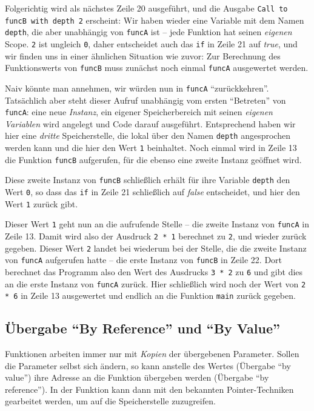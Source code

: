 Folgerichtig wird als nächstes Zeile 20 ausgeführt, und die Ausgabe \texttt{Call to funcB with depth 2} erscheint: Wir haben wieder eine Variable mit dem Namen \texttt{depth}, die aber unabhängig von \texttt{funcA} ist -- jede Funktion hat seinen \emph{eigenen} Scope. \texttt{2} ist ungleich \texttt{0}, daher entscheidet auch das \texttt{if} in Zeile 21 auf \emph{true}, und wir finden uns in einer ähnlichen Situation wie zuvor: Zur Berechnung des Funktionswerts von \texttt{funcB} muss zunächst noch einmal \texttt{funcA} ausgewertet werden.

Naiv könnte man annehmen, wir würden nun in \texttt{funcA} \enquote{zurückkehren}. Tatsächlich aber steht dieser Aufruf unabhängig vom ersten \enquote{Betreten} von \texttt{funcA}: eine neue \emph{Instanz}, \ie ein eigener Speicherbereich mit seinen \emph{eigenen Variablen} wird angelegt und Code darauf ausgeführt. Entsprechend haben wir hier eine \emph{dritte} Speicherstelle, die lokal über den Namen \texttt{depth} angesprochen werden kann und die hier den Wert \texttt{1} beinhaltet. Noch einmal wird in Zeile 13 die Funktion \texttt{funcB} aufgerufen, für die ebenso eine zweite Instanz geöffnet wird.

Diese zweite Instanz von \texttt{funcB} schließlich erhält für ihre Variable \texttt{depth} den Wert \texttt{0}, so dass das \texttt{if} in Zeile 21 schließlich auf \emph{false} entscheidet, und hier den Wert \texttt{1} zurück gibt.

Dieser Wert \texttt{1} geht nun an die aufrufende Stelle -- \ie die zweite Instanz von \texttt{funcA} in Zeile 13. Damit wird also der Ausdruck \texttt{2 * 1} berechnet zu \texttt{2}, und wieder zurück gegeben. Dieser Wert \texttt{2} landet bei wiederum bei der Stelle, die die zweite Instanz von \texttt{funcA} aufgerufen hatte -- die erste Instanz von \texttt{funcB} in Zeile 22. Dort berechnet das Programm also den Wert des Ausdrucks \texttt{3 * 2} zu \texttt{6} und gibt dies an die erste Instanz von \texttt{funcA} zurück. Hier schließlich wird noch der Wert von \texttt{2 * 6} in Zeile 13 ausgewertet und endlich an die Funktion \texttt{main} zurück gegeben.

\subsection{Übergabe \enquote{By Reference} und \enquote{By Value}}
Funktionen arbeiten immer nur mit \emph{Kopien} der übergebenen Parameter. Sollen die Parameter selbst sich ändern, so kann anstelle des Wertes (Übergabe \enquote{by value}) ihre Adresse an die Funktion übergeben werden (Übergabe \enquote{by reference}). In der Funktion kann dann mit den bekannten Pointer-Techniken gearbeitet werden, um auf die Speicherstelle zuzugreifen.

